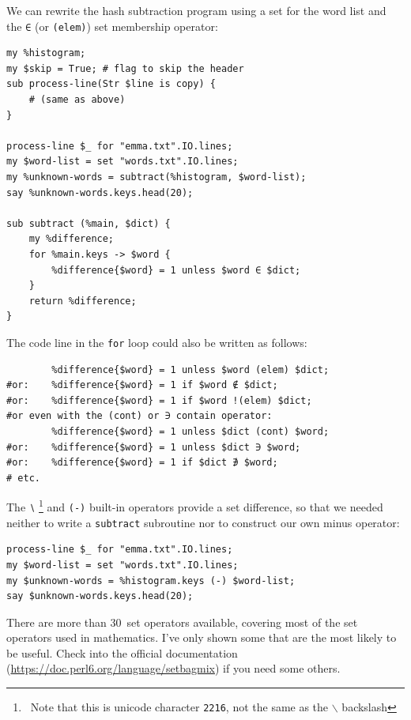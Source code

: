 We can rewrite the hash subtraction program using a set for 
the word list and the  \verb'∈' (or \verb'(elem)') 
set membership operator:

\begin{verbatim}
my %histogram;
my $skip = True; # flag to skip the header
sub process-line(Str $line is copy) {
    # (same as above)
}

process-line $_ for "emma.txt".IO.lines; 
my $word-list = set "words.txt".IO.lines;
my %unknown-words = subtract(%histogram, $word-list);
say %unknown-words.keys.head(20);

sub subtract (%main, $dict) {
	my %difference;
	for %main.keys -> $word {
		%difference{$word} = 1 unless $word ∈ $dict;
	}
	return %difference;
}
\end{verbatim}

The code line in the {\tt for} loop could also be written as follows:

\begin{verbatim}
        %difference{$word} = 1 unless $word (elem) $dict;
#or:    %difference{$word} = 1 if $word ∉ $dict;
#or:    %difference{$word} = 1 if $word !(elem) $dict;
#or even with the (cont) or ∋ contain operator:
        %difference{$word} = 1 unless $dict (cont) $word;
#or:    %difference{$word} = 1 unless $dict ∋ $word;
#or:    %difference{$word} = 1 if $dict ∌ $word;
# etc.
\end{verbatim}

The \verb'∖' \footnote{~Note that this is unicode character {\tt 2216}, 
not the same as the $\backslash$ backslash} and \verb'(-)' built-in operators 
provide a set difference, so that we needed neither to write a 
{\tt subtract} subroutine nor to construct our own minus operator:

\begin{verbatim}
process-line $_ for "emma.txt".IO.lines; 
my $word-list = set "words.txt".IO.lines;
my $unknown-words = %histogram.keys (-) $word-list;
say $unknown-words.keys.head(20);
\end{verbatim}

There are more than 30~set operators available, covering most of 
the set operators used in mathematics. I've only shown 
some that are the most likely to be useful. Check into the 
official documentation (\url{https://doc.perl6.org/language/setbagmix}) 
if you need some others.

